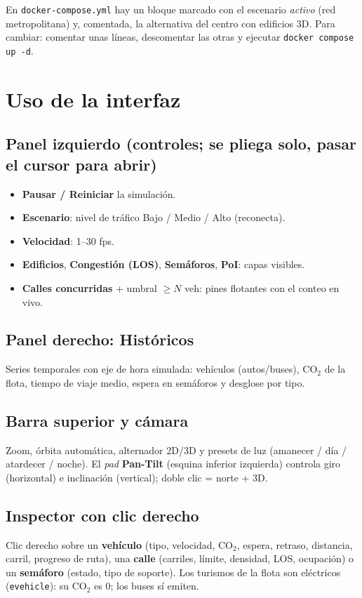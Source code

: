 \documentclass[11pt,a4paper]{article}
\begin{document}
En \texttt{docker-compose.yml} hay un bloque marcado con el escenario
\emph{activo} (red metropolitana) y, comentada, la alternativa del centro con
edificios 3D. Para cambiar: comentar unas líneas, descomentar las otras y
ejecutar \texttt{docker compose up -d}.

\section{Uso de la interfaz}

\subsection{Panel izquierdo (controles; se pliega solo, pasar el cursor para abrir)}
\begin{itemize}
  \item \textbf{Pausar / Reiniciar} la simulación.
  \item \textbf{Escenario}: nivel de tráfico Bajo / Medio / Alto (reconecta).
  \item \textbf{Velocidad}: 1--30 fps.
  \item \textbf{Edificios}, \textbf{Congestión (LOS)}, \textbf{Semáforos},
        \textbf{PoI}: capas visibles.
  \item \textbf{Calles concurridas} + umbral $\geq N$ veh: pines flotantes con el
        conteo en vivo.
\end{itemize}

\subsection{Panel derecho: Históricos}
Series temporales con eje de hora simulada: vehículos (autos/buses), CO$_2$ de la
flota, tiempo de viaje medio, espera en semáforos y desglose por tipo.

\subsection{Barra superior y cámara}
Zoom, órbita automática, alternador 2D/3D y presets de luz (amanecer / día /
atardecer / noche). El \emph{pad} \textbf{Pan-Tilt} (esquina inferior izquierda)
controla giro (horizontal) e inclinación (vertical); doble clic = norte + 3D.

\subsection{Inspector con clic derecho}
Clic derecho sobre un \textbf{vehículo} (tipo, velocidad, CO$_2$, espera,
retraso, distancia, carril, progreso de ruta), una \textbf{calle} (carriles,
límite, densidad, LOS, ocupación) o un \textbf{semáforo} (estado, tipo de
soporte). Los turismos de la flota son eléctricos (\texttt{evehicle}): su
CO$_2$ es 0; los buses sí emiten.
\end{document}

